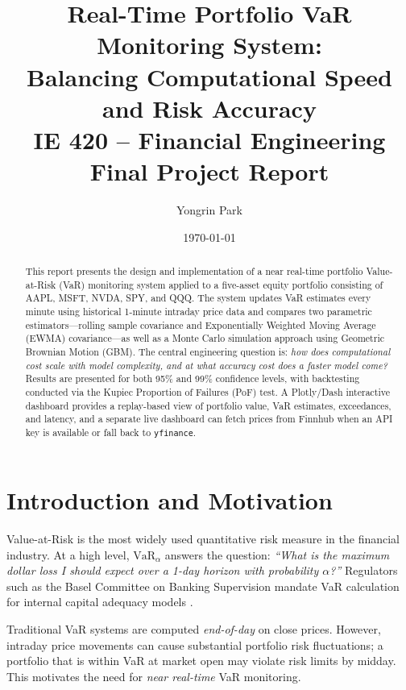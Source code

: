 \documentclass[12pt, a4paper]{article}
\title{%
  \textbf{Real-Time Portfolio VaR Monitoring System:}\\
  \large Balancing Computational Speed and Risk Accuracy\\[0.4em]
  \normalsize IE 420 – Financial Engineering\\
  Final Project Report
}
\author{Yongrin Park}
\date{\today}
\newcommand{\VaR}{\mathrm{VaR}}
\begin{document}
\maketitle
\thispagestyle{empty}
\newpage

\begin{abstract}
This report presents the design and implementation of a near real-time
portfolio Value-at-Risk (VaR) monitoring system applied to a five-asset
equity portfolio consisting of AAPL, MSFT, NVDA, SPY, and QQQ.  The system
updates VaR estimates every minute using historical 1-minute intraday price
data and compares two parametric estimators—rolling sample covariance and
Exponentially Weighted Moving Average (EWMA) covariance—as well as a
Monte Carlo simulation approach using Geometric Brownian Motion (GBM).
The central engineering question is: \emph{how does computational cost scale
with model complexity, and at what accuracy cost does a faster model come?}
Results are presented for both 95\% and 99\% confidence levels, with
backtesting conducted via the Kupiec Proportion of Failures (PoF) test.
A Plotly/Dash interactive dashboard provides a replay-based view of portfolio
value, VaR estimates, exceedances, and latency, and a separate live dashboard
can fetch prices from Finnhub when an API key is available or fall back to
\texttt{yfinance}.
\end{abstract}

\newpage
\tableofcontents
\newpage

\section{Introduction and Motivation}
\label{sec:intro}

Value-at-Risk is the most widely used quantitative risk measure in the
financial industry.  At a high level, $\VaR_\alpha$ answers the question:
\emph{``What is the maximum dollar loss I should expect over a 1-day horizon
with probability $\alpha$?''}  Regulators such as the Basel Committee on
Banking Supervision mandate VaR calculation for internal capital adequacy
models \citep{basel1996}.

Traditional VaR systems are computed \emph{end-of-day} on close prices.
However, intraday price movements can cause substantial portfolio risk
fluctuations; a portfolio that is within VaR at market open may violate
risk limits by midday.  This motivates the need for \emph{near real-time}
VaR monitoring.
\end{document}
